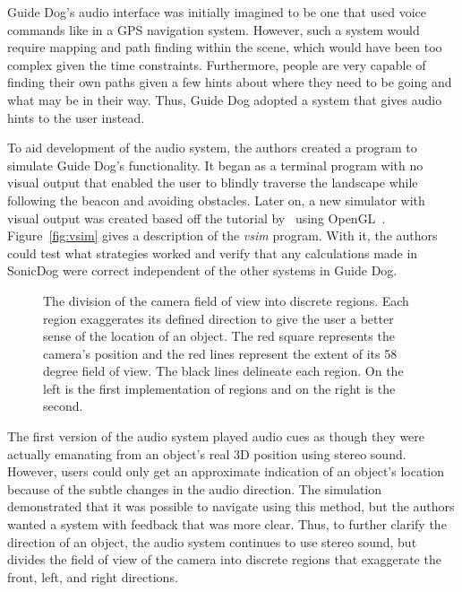 Guide Dog's audio interface was initially imagined to be one that used voice
commands like in a GPS navigation system. However, such a system would require
mapping and path finding within the scene, which would have been too complex
given the time constraints. Furthermore, people are very capable of finding
their own paths given a few hints about where they need to be going and what
may be in their way. Thus, Guide Dog adopted a system that gives audio hints to
the user instead.

To aid development of the audio system, the authors created a program to
simulate Guide Dog's functionality. It began as a terminal program with no
visual output that enabled the user to blindly traverse the landscape while
following the beacon and avoiding obstacles. Later on, a new simulator with 
visual output was created based off the tutorial by~\cite{openal-tutorial} using
OpenGL~\cite{opengl-website}. Figure~\ref{fig:vsim} gives a description of the 
\emph{vsim} program. With it, the authors could test what strategies worked and
verify that any calculations made in SonicDog were correct independent of the
other systems in Guide Dog.

\begin{figure}
\caption{The division of the camera field of view into discrete regions. Each
region exaggerates its defined direction to give the user a better sense of the
location of an object. The red square represents the camera's position and the
red lines represent the extent of its 58 degree field of view. The black lines
delineate each region. On the left is the first implementation of regions and
on the right is the second.}
\label{fig:regions}
\end{figure}

The first version of the audio system played audio cues as though they were
actually emanating from an object's real 3D position using stereo sound. However,
users could only get an approximate indication of an object's location because
of the subtle changes in the audio direction. The simulation demonstrated that
it was possible to navigate using this method, but the authors wanted a system
with feedback that was more clear. Thus, to further clarify the direction of an 
object, the audio system continues to use stereo sound, but divides the field of
view of the camera into discrete regions that exaggerate the front, left, and 
right directions.

